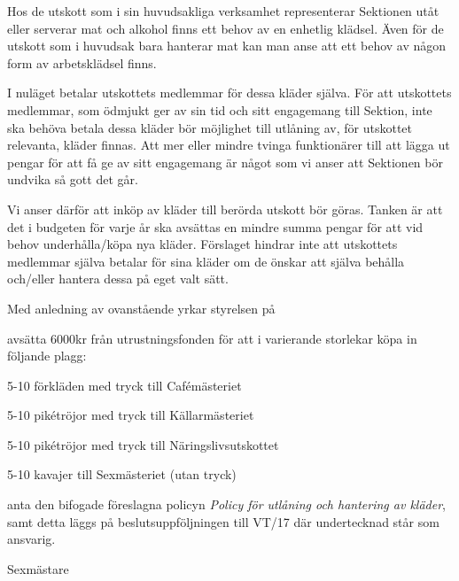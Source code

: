 \documentclass[../_main/handlingar.tex]{subfiles}
\begin{document}

Hos de utskott som i sin huvudsakliga verksamhet representerar Sektionen utåt eller serverar mat och alkohol finns ett behov av en enhetlig klädsel. Även för de utskott som i huvudsak bara hanterar mat kan man anse att ett behov av någon form av arbetsklädsel finns.

I nuläget betalar utskottets medlemmar för dessa kläder själva. För att utskottets medlemmar, som ödmjukt ger av sin tid och sitt engagemang till Sektion, inte ska behöva betala dessa kläder bör möjlighet till utlåning av, för utskottet relevanta, kläder finnas. Att mer eller mindre tvinga funktionärer till att lägga ut pengar för att få ge av sitt engagemang är något som vi anser att Sektionen bör undvika så gott det går.

Vi anser därför att inköp av kläder till berörda utskott bör göras. Tanken är att det i budgeten för varje år ska avsättas en mindre summa pengar för att vid behov underhålla/köpa nya kläder. Förslaget hindrar inte att utskottets medlemmar själva betalar för sina kläder om de önskar att själva behålla och/eller hantera dessa på eget valt sätt.

Med anledning av ovanstående yrkar styrelsen på

\begin{attsatser}
    \att avsätta 6000kr från utrustningsfonden för att i varierande storlekar köpa in följande plagg:
    \begin{dashlist}
        \item 5-10 förkläden med tryck till Cafémästeriet
        \item 5-10 pikétröjor med tryck till Källarmästeriet
        \item 5-10 pikétröjor med tryck till Näringslivsutskottet
        \item 5-10 kavajer till Sexmästeriet (utan tryck)
    \end{dashlist}

    \att anta den bifogade föreslagna policyn \emph{Policy för utlåning och hantering av kläder}, samt
    \att detta läggs på beslutsuppföljningen till VT/17 där undertecknad står som ansvarig.
\end{attsatser}

\begin{signatures}{1}
    \ist
    \signature{Martin Gemborn Nilsson}{Sexmästare}
\end{signatures}
\end{document}
